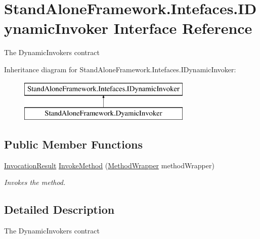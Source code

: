 \hypertarget{interface_stand_alone_framework_1_1_intefaces_1_1_i_dynamic_invoker}{\section{Stand\+Alone\+Framework.\+Intefaces.\+I\+Dynamic\+Invoker Interface Reference}
\label{interface_stand_alone_framework_1_1_intefaces_1_1_i_dynamic_invoker}
}


The Dynamic\+Invokers contract  


Inheritance diagram for Stand\+Alone\+Framework.\+Intefaces.\+I\+Dynamic\+Invoker\+:\begin{figure}[H]
\begin{center}
\leavevmode
\includegraphics[height=2.000000cm]{interface_stand_alone_framework_1_1_intefaces_1_1_i_dynamic_invoker}
\end{center}
\end{figure}
\subsection*{Public Member Functions}
\begin{DoxyCompactItemize}
\item 
\hyperlink{class_stand_alone_framework_1_1_framework_classes_1_1_invocation_result}{Invocation\+Result} \hyperlink{interface_stand_alone_framework_1_1_intefaces_1_1_i_dynamic_invoker_ad3978a717b76fbd44c1f8ce6c08564cc}{Invoke\+Method} (\hyperlink{class_stand_alone_framework_1_1_factories_1_1_method_factory_1_1_method_wrapper}{Method\+Wrapper} method\+Wrapper)
\begin{DoxyCompactList}\small\item\em Invokes the method. \end{DoxyCompactList}\end{DoxyCompactItemize}


\subsection{Detailed Description}
The Dynamic\+Invokers contract 



